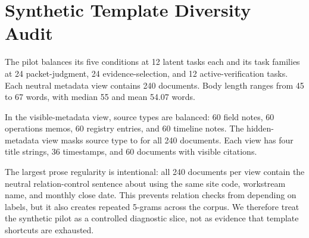 \section{Synthetic Template Diversity Audit}
\label{app:template-diversity}

The pilot balances its five conditions at 12 latent tasks each and its task families at 24 packet-judgment, 24 evidence-selection, and 12 active-verification tasks. Each neutral metadata view contains 240 documents. Body length ranges from 45 to 67 words, with median 55 and mean 54.07 words.

In the visible-metadata view, source types are balanced: 60 field notes, 60 operations memos, 60 registry entries, and 60 timeline notes. The hidden-metadata view masks source type to  for all 240 documents. Each view has four title strings, 36 timestamps, and 60 documents with visible citations.

The largest prose regularity is intentional: all 240 documents per view contain the neutral relation-control sentence about using the same site code, workstream name, and monthly close date. This prevents relation checks from depending on labels, but it also creates repeated 5-grams across the corpus. We therefore treat the synthetic pilot as a controlled diagnostic slice, not as evidence that template shortcuts are exhausted.

